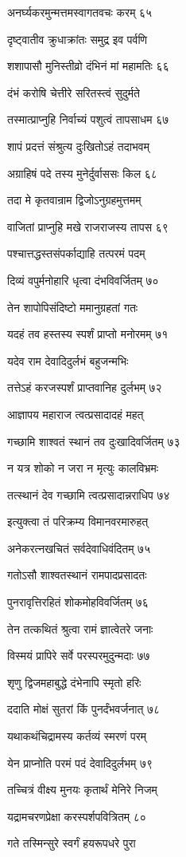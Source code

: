 अनर्घ्यकरमुन्मत्तमस्वागतवचः करम् ६५

दृष्ट्वातीव क्रुधाक्रांतः समुद्र इव पर्वणि

शशापासौ मुनिस्तीव्रो दंभिनं मां महामतिः ६६

दंभं करोषि चेत्तीरे सरितस्त्वं सुदुर्मते

तस्मात्प्राप्नुहि निर्वाच्यं पशुत्वं तापसाधम ६७

शापं प्रदत्तं संश्रुत्य दुःखितोऽहं तदाभवम्

अग्राहिषं पदे तस्य मुनेर्दुर्वाससः किल ६८

तदा मे कृतवान्राम द्विजोऽनुग्रहमुत्तमम्

वाजितां प्राप्नुहि मखे राजराजस्य तापस ६९

पश्चात्तद्धस्तसंपर्काद्याहि तत्परमं पदम्

दिव्यं वपुर्मनोहारि धृत्वा दंभविवर्जितम् ७०

तेन शापोपिसंदिष्टो ममानुग्रहतां गतः

यदहं तव हस्तस्य स्पर्शं प्राप्तो मनोरमम् ७१

यदेव राम देवादिदुर्लभं बहुजन्मभिः

तत्तेऽहं करजस्पर्शं प्राप्तवानिह दुर्लभम् ७२

आज्ञापय महाराज त्वत्प्रसादादहं महत्

गच्छामि शाश्वतं स्थानं तव दुःखादिवर्जितम् ७३

न यत्र शोको न जरा न मृत्युः कालविभ्रमः

तत्स्थानं देव गच्छामि त्वत्प्रसादान्नराधिप ७४

इत्युक्त्वा तं परिक्रम्य विमानवरमारुहत्

अनेकरत्नखचितं सर्वदेवाधिवंदितम् ७५

गतोऽसौ शाश्वतस्थानं रामपादप्रसादतः

पुनरावृत्तिरहितं शोकमोहविवर्जितम् ७६

तेन तत्कथितं श्रुत्वा रामं ज्ञात्वेतरे जनाः

विस्मयं प्रापिरे सर्वे परस्परमुदुन्मदाः ७७

शृणु द्विजमहाबुद्धे दंभेनापि स्मृतो हरिः

ददाति मोक्षं सुतरां किं पुनर्दंभवर्जनात् ७८

यथाकथंचिद्रामस्य कर्तव्यं स्मरणं परम्

येन प्राप्नोति परमं पदं देवादिदुर्लभम् ७९

तच्चित्रं वीक्ष्य मुनयः कृतार्थं मेनिरे निजम्

यद्रामचरणप्रेक्षा करस्पर्शपवित्रितम् ८०

गते तस्मिन्सुरे स्वर्गं हयरूपधरे पुरा

